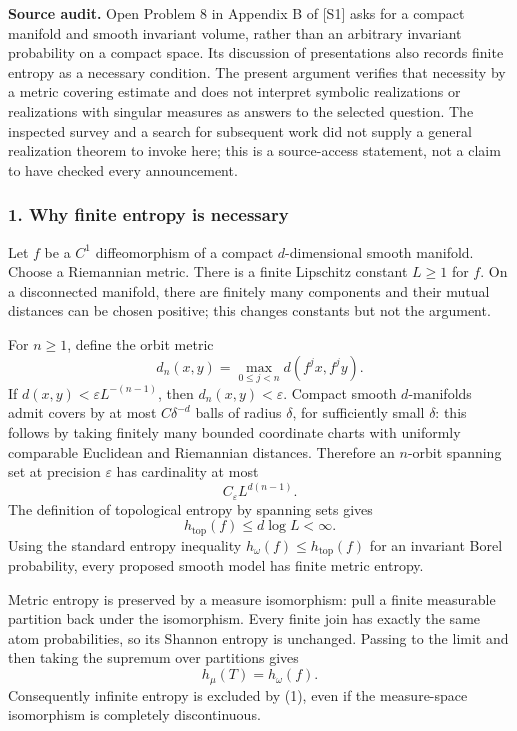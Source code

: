 \documentclass[11pt]{article}
\begin{document}
\textbf{Source audit.} Open Problem 8 in Appendix B of [S1] asks for a compact manifold and smooth invariant volume, rather than an arbitrary invariant probability on a compact space. Its discussion of presentations also records finite entropy as a necessary condition. The present argument verifies that necessity by a metric covering estimate and does not interpret symbolic realizations or realizations with singular measures as answers to the selected question. The inspected survey and a search for subsequent work did not supply a general realization theorem to invoke here; this is a source-access statement, not a claim to have checked every announcement.

\subsubsection{1. Why finite entropy is necessary}
Let $f$ be a $C^1$ diffeomorphism of a compact $d$-dimensional smooth manifold. Choose a Riemannian metric. There is a finite Lipschitz constant $L\geq1$ for $f$. On a disconnected manifold, there are finitely many components and their mutual distances can be chosen positive; this changes constants but not the argument.

For $n\geq1$, define the orbit metric
\[
 d_n(x,y)=\max_{0\leq j<n}d(f^jx,f^jy).
\]
If $d(x,y)<\varepsilon L^{-(n-1)}$, then $d_n(x,y)<\varepsilon$. Compact smooth $d$-manifolds admit covers by at most $C\delta^{-d}$ balls of radius $\delta$, for sufficiently small $\delta$: this follows by taking finitely many bounded coordinate charts with uniformly comparable Euclidean and Riemannian distances. Therefore an $n$-orbit spanning set at precision $\varepsilon$ has cardinality at most
\[
 C_\varepsilon L^{d(n-1)}.
\]
The definition of topological entropy by spanning sets gives
\[
 h_{\mathrm{top}}(f)\leq d\log L<\infty.                 \tag{1}
\]
Using the standard entropy inequality $h_\omega(f)\leq h_{\mathrm{top}}(f)$ for an invariant Borel probability, every proposed smooth model has finite metric entropy.

Metric entropy is preserved by a measure isomorphism: pull a finite measurable partition back under the isomorphism. Every finite join has exactly the same atom probabilities, so its Shannon entropy is unchanged. Passing to the limit and then taking the supremum over partitions gives
\[
 h_\mu(T)=h_\omega(f).                                  \tag{2}
\]
Consequently infinite entropy is excluded by (1), even if the measure-space isomorphism is completely discontinuous.
\end{document}
